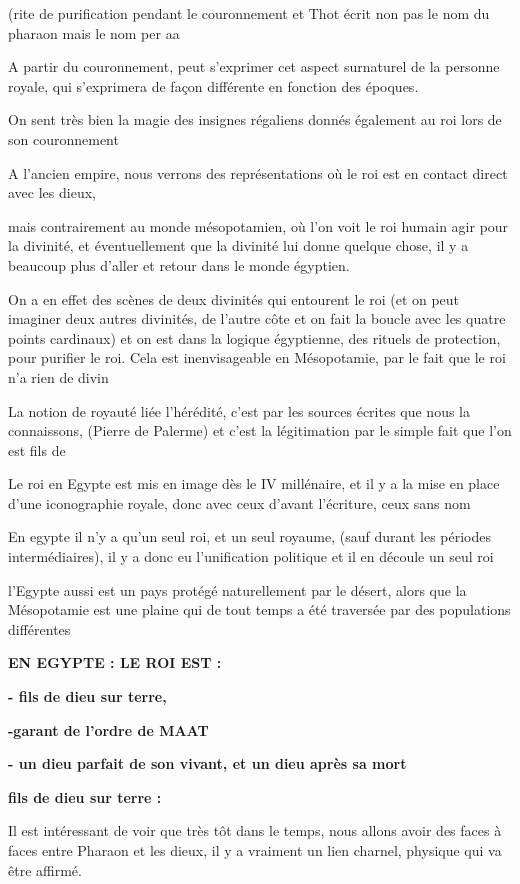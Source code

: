 \documentclass[a4paper,10pt]{article}
\begin{document}
(rite de purification pendant le couronnement et Thot écrit non pas le
nom du pharaon mais le nom  per aa

A partir du couronnement, peut s'exprimer cet aspect
surnaturel de la personne royale, qui s'exprimera de
façon différente en fonction des époques. 

On sent très bien la magie des insignes régaliens donnés également au
roi lors de son couronnement

A l'ancien empire, nous verrons des représentations où
le roi est en contact direct avec les dieux, 

mais contrairement au monde mésopotamien, où l'on voit
le roi humain agir pour la divinité, et éventuellement que la divinité
lui donne quelque chose, il y a beaucoup plus d'aller
et retour dans le monde égyptien.

On a en effet des scènes de deux divinités qui entourent le roi (et on
peut imaginer deux autres divinités, de l'autre côte
et on fait la boucle avec les quatre points cardinaux) et on est dans
la logique égyptienne, des rituels de protection, pour purifier le roi.
Cela est inenvisageable en Mésopotamie, par le fait que le roi
n'a rien de divin

La notion de royauté liée  l'hérédité,
c'est par les sources écrites que nous la connaissons,
(Pierre de Palerme) et c'est la légitimation par le
simple fait que l'on est fils de 

Le roi en Egypte est mis en image dès le IV millénaire, et il y a la
mise en place d'une iconographie royale, donc avec
ceux d'avant l'écriture, ceux sans
nom

En egypte  il n'y a qu'un seul roi, et
un seul royaume, (sauf durant les périodes intermédiaires), il y a donc
eu l'unification politique et il en découle un seul
roi

l'Egypte aussi est un pays protégé naturellement par le
désert, alors que la Mésopotamie est une plaine qui de tout temps a été
traversée par des populations différentes

\textbf{EN EGYPTE : LE ROI EST :}

\textbf{{}- fils de dieu sur terre,}

\textbf{{}-garant de l'ordre de MAAT}

\textbf{{}- un dieu parfait de son vivant, et un dieu après sa mort}

\textbf{fils de dieu sur terre : }

Il est intéressant de voir que très tôt dans le temps, nous allons avoir
des faces à faces entre Pharaon et les dieux, il y a vraiment un lien
charnel, physique qui va être affirmé.
\end{document}
